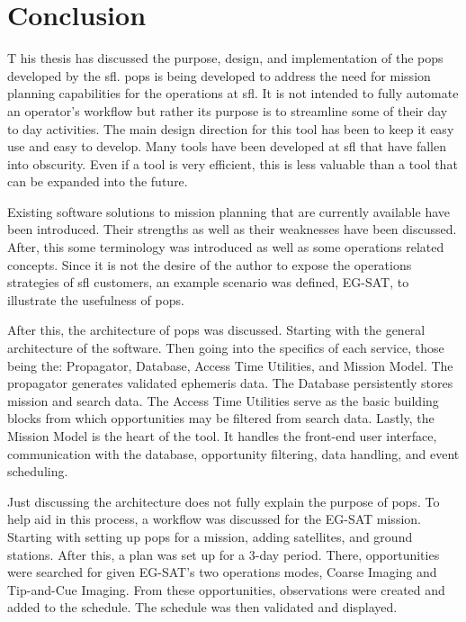 \glsresetall{} 

\chapter{Conclusion}\label{chap:conclusion}

\lettrine[lines=2, findent=0pt, nindent=5pt]{T}{} his thesis has discussed
the purpose, design, and implementation of the \gls{pops} developed by the
\gls{sfl}. \gls{pops} is being developed to address the need for mission
planning capabilities for the operations at \gls{sfl}. It is not intended to
fully automate an operator's workflow but rather its purpose is to streamline
some of their day to day activities. The main design direction for this tool
has been to keep it easy use and easy to develop. Many tools have been
developed at \gls{sfl} that have fallen into obscurity. Even if a tool is
very efficient, this is less valuable than a tool that can be expanded into the
future. 

Existing software solutions to mission planning that are currently available
have been introduced. Their strengths as well as their weaknesses have been
discussed. After, this some terminology was introduced as well as some
operations related concepts. Since it is not the desire of the author to expose
the operations strategies of \gls{sfl} customers, an example scenario was
defined, EG-SAT, to illustrate the usefulness of \gls{pops}.

After this, the architecture of \gls{pops} was discussed. Starting with the
general architecture of the software. Then going into the specifics of each
service, those being the: Propagator, Database, Access Time Utilities, and
Mission Model. The propagator generates validated ephemeris data. The Database
persistently stores mission and search data. The Access Time Utilities serve as
the basic building blocks from which opportunities may be filtered from search
data. Lastly, the Mission Model is the heart of the tool.  It handles the
front-end user interface, communication with the database, opportunity
filtering, data handling, and event scheduling.

Just discussing the architecture does not fully explain the purpose of
\gls{pops}. To help aid in this process, a workflow was discussed for the
EG-SAT mission. Starting with setting up \gls{pops} for a mission, adding
satellites, and ground stations. After this, a plan was set up for a 3-day
period. There, opportunities were searched for given EG-SAT's two operations
modes, Coarse Imaging and Tip-and-Cue Imaging. From these opportunities,
observations were created and added to the schedule. The schedule was then
validated and displayed.  

